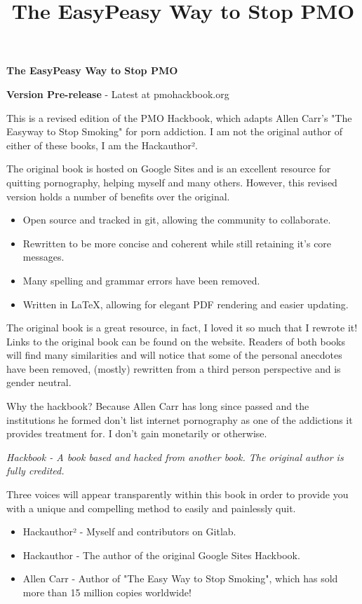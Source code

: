 \documentclass[easypeasy.tex]{subfiles}
\title {The EasyPeasy Way to Stop PMO}
\begin{document}
\begin{center}
  {\Huge\bfseries The EasyPeasy Way to Stop PMO \par}
  {\small \textbf{Version Pre-release} - Latest at pmohackbook.org} 
\end{center}

This is a revised edition of the PMO Hackbook, which adapts Allen Carr's "The Easyway to Stop Smoking" for porn addiction. I am not the original author of either of these books, I am the Hackauthor².

The original book is hosted on Google Sites and is an excellent resource for quitting pornography, helping myself and many others. However, this revised version holds a number of benefits over the original.
\begin{itemize}
\item Open source and tracked in git, allowing the community to collaborate.
\item Rewritten to be more concise and coherent while still retaining it's core messages.
\item Many spelling and grammar errors have been removed.
\item Written in LaTeX, allowing for elegant PDF rendering and easier updating.
\end{itemize}

The original book is a great resource, in fact, I loved it so much that I rewrote it! Links to the original book can be found on the website. Readers of both books will find many similarities and will notice that some of the personal anecdotes have been removed, (mostly) rewritten from a third person perspective and is gender neutral.

Why the hackbook? Because Allen Carr has long since passed and the institutions he formed don't list internet pornography as one of the addictions it provides treatment for. I don't gain monetarily or otherwise.

\textit{{\small Hackbook - A book based and hacked from another book. The original author is fully credited.}}

Three voices will appear transparently within this book in order to provide you with a unique and compelling method to easily and painlessly quit.
\begin{itemize}
  \item Hackauthor² - Myself and contributors on Gitlab.
  \item Hackauthor - The author of the original Google Sites Hackbook.
  \item Allen Carr - Author of "The Easy Way to Stop Smoking", which has sold more than 15 million copies worldwide!
\end{itemize}
\end{document}
